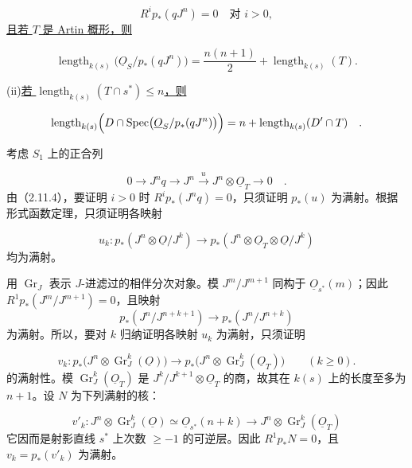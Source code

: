 \begin{equation*}
R^ip_*(qJ^n)=0\quad\text{对 }i>0,
\end{equation*}
\underline{且若 $T$ 是 Artin 概形，则}

\begin{equation*}
\operatorname{length}_{k(s)}
\bigl(\underline{O}_S/p_*(qJ^n)\bigr)
=\frac{n(n+1)}2+\operatorname{length}_{k(s)}(T).
\end{equation*}


(ii)\quad \underline{若 $\operatorname{length}_{k(s)}(T\cap s^*)\leq n$，则}

\begin{equation*}
\operatorname{length}_{k(s)}
\Bigl(D\cap
\operatorname{Spec}\bigl(\underline{O}_S/p_*(qJ^n)\bigr)\Bigr)
=n+\operatorname{length}_{k(s)}(D'\cap T) \quad .
\end{equation*}

考虑 $S_1$ 上的正合列

\begin{equation}\tag{2.14.1}
0\longrightarrow J^nq
\longrightarrow J^n
\xrightarrow{\,u\,}J^n\otimes\underline{O}_T
\longrightarrow0 \quad .
\end{equation}
由（2.11.4），要证明 $i>0$ 时 $R^ip_*(J^nq)=0$，只须证明 $p_*(u)$ 为满射。根据形式函数定理，只须证明各映射

\begin{equation*}
u_k:p_*(J^n\otimes\underline{O}/J^k)
\longrightarrow
p_*(J^n\otimes\underline{O}_T\otimes\underline{O}/J^k)
\end{equation*}
均为满射。

用 $\operatorname{Gr}_J$ 表示 $J$-进滤过的相伴分次对象。模 $J^m/J^{m+1}$ 同构于 $\underline{O}_{s^*}(m)$；因此 $R^1p_*(J^m/J^{m+1})=0$，且映射 \[
p_*(J^n/J^{n+k+1})\longrightarrow p_*(J^n/J^{n+k})
\] 为满射。所以，要对 $k$ 归纳证明各映射 $u_k$ 为满射，只须证明

\begin{equation*}
v_k:p_*\bigl(J^n\otimes\operatorname{Gr}_J^k(\underline{O})\bigr)
\longrightarrow
p_*\bigl(J^n\otimes\operatorname{Gr}_J^k(\underline{O}_T)\bigr)
\qquad(k\geq0).
\end{equation*}
的满射性。模 $\operatorname{Gr}_J^k(\underline{O}_T)$ 是 $J^k/J^{k+1}\otimes\underline{O}_T$ 的商，故其在 $k(s)$ 上的长度至多为 $n+1$。设 $N$ 为下列满射的核：

\begin{equation*}
v'_k:J^n\otimes\operatorname{Gr}_J^k(\underline{O})
\simeq\underline{O}_{s^*}(n+k)
\longrightarrow
J^n\otimes\operatorname{Gr}_J^k(\underline{O}_T)
\end{equation*}
它因而是射影直线 $s^*$ 上次数 $\geq-1$ 的可逆层。因此 $R^1p_*N=0$，且 $v_k=p_*(v'_k)$ 为满射。

